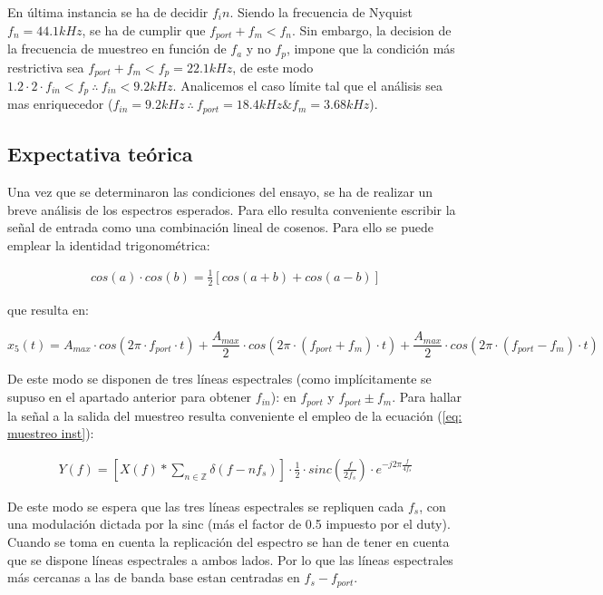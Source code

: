 En última instancia se ha de decidir $f_in$. Siendo la frecuencia de Nyquist $f_n = 44.1kHz$, se ha de cumplir que $f_{port} + f_{m} < f_n$. Sin embargo, la decision de la frecuencia de muestreo en función de $f_a$ y no $f_p$, impone que la condición más restrictiva sea $f_{port} + f_{m} < f_p = 22.1kHz$, de este modo $1.2 \cdot 2 \cdot f_{in} < f_p \: \therefore \: f_{in} < 9.2kHz$. Analicemos el caso límite tal que el análisis sea mas enriquecedor ($f_{in} = 9.2kHz\: \therefore \: f_{port} = 18.4kHz \& f_m = 3.68kHz$).

\subsection{Expectativa teórica}
Una vez que se determinaron las condiciones del ensayo, se ha de realizar un breve análisis de los espectros esperados. Para ello resulta conveniente escribir la señal de entrada como una combinación lineal de cosenos. Para ello se puede emplear la identidad trigonométrica:

\begin{align*}
    cos(a) \cdot cos(b) = \frac{1}{2} [cos(a+b)+cos(a-b)]
\end{align*}

\noindent que resulta en:

\begin{equation}
    x_5(t) = A_{max} \cdot cos(2\pi \cdot f_{port} \cdot t) + \frac{A_{max}}{2} \cdot cos(2\pi \cdot (f_{port} + f_{m}) \cdot t) + \frac{A_{max}}{2} \cdot cos(2\pi \cdot (f_{port} - f_{m}) \cdot t)
\end{equation}

\noindent De este modo se disponen de tres líneas espectrales (como implícitamente se supuso en el apartado anterior para obtener $f_{in}$): en $f_{port}$ y $f_{port}\pm f_m$. Para hallar la señal a la salida del muestreo resulta conveniente el empleo de la ecuación (\ref{eq: muestreo inst}):

\begin{align*}
Y(f) = \left[X(f) * \sum_{n \in \mathbb{Z}} \delta(f-nf_s)\right] 
\cdot \frac{1}{2} \cdot sinc\left(\frac{f}{2f_s}\right) 
\cdot e^{-j2\pi \frac{f}{4f_s}}
\end{align*}

\noindent De este modo se espera que las tres líneas espectrales se repliquen cada $f_s$, con una modulación dictada por la sinc (más el factor de 0.5 impuesto por el duty). Cuando se toma en cuenta la replicación del espectro se han de tener en cuenta que se dispone líneas espectrales a ambos lados. Por lo que las líneas espectrales más cercanas a las de banda base estan centradas en $f_s-f_{port}$.

